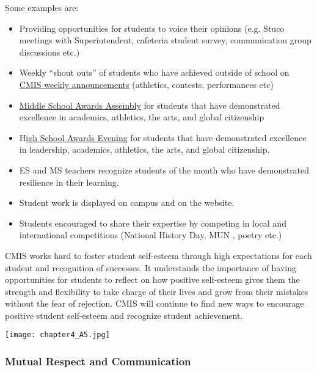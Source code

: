 \begin{findings}
Some examples are:
\begin{itemize}
\item Providing opportunities for students to voice their opinions (e.g. Stuco meetings with Superintendent, cafeteria student survey, communication group discussions etc.)
\item Weekly “shout outs” of students who have achieved outside of school on \href{http://blogs.cmis.ac.th/eagles/friday-september-16-2016/}{CMIS weekly announcements} (athletics, contests, performances etc)
\item\href{https://docs.google.com/a/cmis.ac.th/document/d/1DgY3NXB6m6qvmWnaRr2B2jswCGHRjaPFNPJA2Xzk1qw/edit?usp=sharing}{ Middle School Awards Assembly} for students that have demonstrated excellence in academics, athletics, the arts, and global citizenship
\item H\href{https://docs.google.com/document/d/1pxioSUeOgKZ4dT1jA9DiVzDjZjtrxuM-Gjqh7fRy0Us/edit?usp=sharing}{igh School Awards Evening} for students that have demonstrated excellence in leadership, academics, athletics, the arts, and global  citizenship.
\item ES and MS teachers recognize students of the month who have demonstrated resilience in their learning.
\item Student work is displayed on campus and on the website. 
\item Students encouraged to share their expertise by competing in local and international competitions (National History Day, MUN , poetry  etc.)
\end{itemize}


CMIS works hard to foster student self-esteem through high expectations for each student and recognition of successes. It understands the importance of having opportunities for students to reflect on how positive self-esteem gives them the strength and flexibility to take charge of their lives and grow from their mistakes without the fear of rejection. CMIS will continue to find new ways to encourage positive student self-esteem and recognize student achievement. 
\end{findings}

{\centering\texttt{[image: chapter4\_A5.jpg]}}

\subsubsection{Mutual Respect and Communication}

